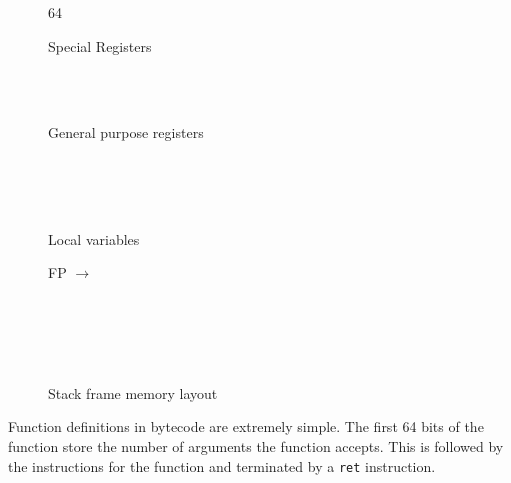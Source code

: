 \documentclass[english,a4paper,12pt]{report}
\begin{document}
\begin{figure}[!htb]
	\centering
	\begin{bytefield}[bitwidth=0.3em,endianness=big,leftcurly=., leftcurlyspace=0pt]{64}
		 \\
		\begin{rightwordgroup}{Special Registers}
			  \\
			 \\
		\end{rightwordgroup} \\
		
		\begin{rightwordgroup}{General purpose registers}
			\\
			\\
			\\
		\end{rightwordgroup} 
\\
		
		\begin{rightwordgroup}{Local variables}
          \begin{leftwordgroup}{FP $\rightarrow$}
          \end{leftwordgroup} \\
			 \\[1ex]
		\end{rightwordgroup} \\
	\end{bytefield}
	\caption{Stack frame memory layout}
	\label{fig:stframe}
\end{figure}

Function definitions in bytecode are extremely simple. The first 64
bits of the function store the number of arguments the function
accepts. This is followed by the instructions for the function and
terminated by a \verb|ret| instruction.
\end{document}
